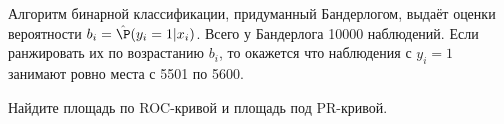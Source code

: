 \documentclass[pdftex, 12pt, a4paper]{article}
\begin{document}
\begin{problem}
	Алгоритм бинарной классификации, придуманный Бандерлогом, выдаёт оценки вероятности $b_i = \hat\P(y_i=1 | x_i)$. Всего у Бандерлога 10000 наблюдений. Если ранжировать их по возрастанию $b_i$, то окажется что наблюдения с $y_i = 1$ занимают ровно места с  5501 по 5600.
	
	Найдите площадь по ROC-кривой и площадь под PR-кривой.
	\begin{sol}
	\end{sol}
\end{problem}
\end{document}
